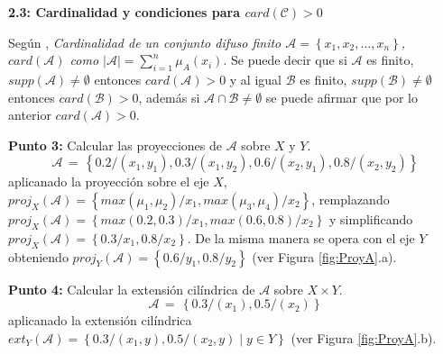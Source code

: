 \documentclass[10pt,onecolumn,twoside,letterpaper]{article}
\begin{document}
\par{\bf 2.3: Cardinalidad y condiciones para $card(\mathcal{C})>0$}\\
\par Seg\'un \cite{Babuska1999}, \emph{Cardinalidad de un conjunto difuso finito $\mathcal{A}=\left\{x_1,x_2,\ldots,x_n\right\}$, $card(\mathcal{A})$ como $\left|\mathcal{A}\right|=\sum_{i=1}^n\mu_A(x_i)$}. Se puede decir que si $\mathcal{A}$ es finito, $supp(\mathcal{A})\neq\emptyset$ entonces $card(\mathcal{A})>0$ y al igual $\mathcal{B}$ es finito, $supp(\mathcal{B})\neq\emptyset$ entonces $card(\mathcal{B})>0$, adem\'as si $\mathcal{A}\cap\mathcal{B}\neq\emptyset$ se puede afirmar que por lo anterior $card(\mathcal{A})>0$.
\par{\bf \large Punto 3:} Calcular las proyecciones de $\mathcal{A}$ sobre $X$ y $Y$.
\begin{equation}
  \label{eq:ej3}
  \mathcal{A}\,=\,\left\{0.2/(x_1,y_1),0.3/(x_1,y_2),0.6/(x_2,y_1),0.8/(x_2,y_2)\right\}
\end{equation}
aplicanado la proyecci\'on sobre el eje $X$, $proj_X(\mathcal{A})=\left\{max(\mu_1,\mu_2)/x_1,max(\mu_3,\mu_4)/x_2\right\}$, remplazando $proj_X(\mathcal{A})=\left\{max(0.2,0.3)/x_1,max(0.6,0.8)/x_2\right\}$ y simplificando $proj_X(\mathcal{A})=\left\{0.3/x_1,0.8/x_2\right\}$. De la misma manera se opera con el eje $Y$ obteniendo $proj_Y(\mathcal{A})=\left\{0.6/y_1,0.8/y_2\right\}$  (ver Figura \ref{fig:ProyA}.a).
\par{\bf \large Punto 4:} Calcular la extensi\'on cil\'indrica de $\mathcal{A}$ sobre $X\times Y$.
\begin{equation}
  \label{eq:ej3}
  \mathcal{A}\,=\,\left\{0.3/(x_1),0.5/(x_2)\right\}
\end{equation}
aplicanado la extensi\'on cil\'indrica $ext_Y(\mathcal{A})=\left\{0.3/(x_1,y),0.5/(x_2,y)\mid y\in Y\right\}$ (ver Figura \ref{fig:ProyA}.b).
\end{document}
